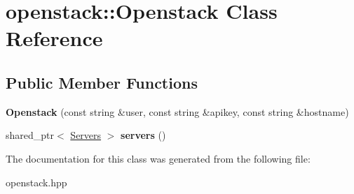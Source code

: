 \hypertarget{classopenstack_1_1Openstack}{
\section{openstack::Openstack Class Reference}
\label{classopenstack_1_1Openstack}
}
\subsection*{Public Member Functions}
\begin{DoxyCompactItemize}
\item 
\hypertarget{classopenstack_1_1Openstack_a69e20b0b47a39d45fdba732108ea3221}{
{\bfseries Openstack} (const string \&user, const string \&apikey, const string \&hostname)}
\label{classopenstack_1_1Openstack_a69e20b0b47a39d45fdba732108ea3221}

\item 
\hypertarget{classopenstack_1_1Openstack_a56787023dff6d5e5355caa4c931fe097}{
shared\_\-ptr$<$ \hyperlink{classopenstack_1_1Servers}{Servers} $>$ {\bfseries servers} ()}
\label{classopenstack_1_1Openstack_a56787023dff6d5e5355caa4c931fe097}

\end{DoxyCompactItemize}


The documentation for this class was generated from the following file:\begin{DoxyCompactItemize}
\item 
openstack.hpp\end{DoxyCompactItemize}
